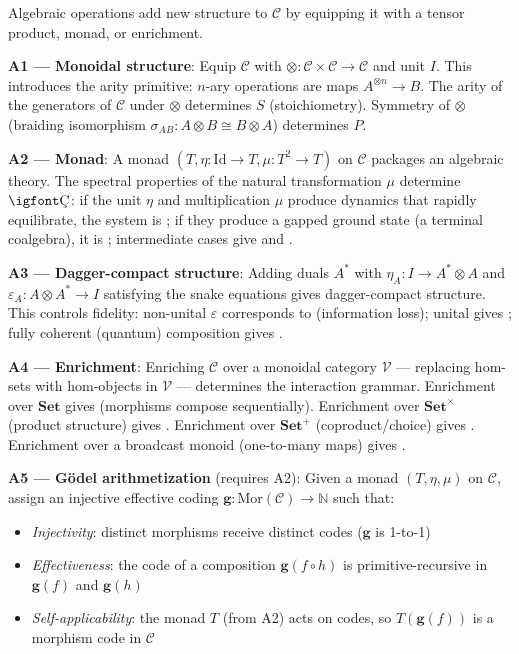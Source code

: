 \documentclass[12pt,a4paper]{article}
\newcommand{\igprimfont}{\igfont\upshape}
\begin{document}
Algebraic operations add new structure to $\mathcal{C}$ by equipping it with a tensor product, monad, or enrichment.

\textbf{A1 --- Monoidal structure}: Equip $\mathcal{C}$ with $\otimes: \mathcal{C} \times \mathcal{C} \to \mathcal{C}$ and unit $I$. This introduces the arity primitive: $n$-ary operations are maps $A^{\otimes n} \to B$. The arity of the generators of $\mathcal{C}$ under $\otimes$ determines $S$ (stoichiometry). Symmetry of $\otimes$ (braiding isomorphism $\sigma_{AB}: A \otimes B \cong B \otimes A$) determines $P$.

\textbf{A2 --- Monad}: A monad $(T, \eta: \text{Id} \to T, \mu: T^2 \to T)$ on $\mathcal{C}$ packages an algebraic theory. The spectral properties of the natural transformation $\mu$ determine $\text{{\igprimfont Ç}}$: if the unit $\eta$ and multiplication $\mu$ produce dynamics that rapidly equilibrate, the system is ; if they produce a gapped ground state (a terminal coalgebra), it is ; intermediate cases give  and .

\textbf{A3 --- Dagger-compact structure}: Adding duals $A^*$ with $\eta_A: I \to A^* \otimes A$ and $\varepsilon_A: A \otimes A^* \to I$ satisfying the snake equations gives dagger-compact structure. This controls fidelity: non-unital $\varepsilon$ corresponds to  (information loss); unital gives ; fully coherent (quantum) composition gives .

\textbf{A4 --- Enrichment}: Enriching $\mathcal{C}$ over a monoidal category $\mathcal{V}$ --- replacing hom-sets with hom-objects in $\mathcal{V}$ --- determines the interaction grammar. Enrichment over $\mathbf{Set}$ gives  (morphisms compose sequentially). Enrichment over $\mathbf{Set}^\times$ (product structure) gives . Enrichment over $\mathbf{Set}^+$ (coproduct/choice) gives . Enrichment over a broadcast monoid (one-to-many maps) gives .

\textbf{A5 --- G\"odel arithmetization} (requires A2): Given a monad $(T, \eta, \mu)$ on $\mathcal{C}$, assign an injective effective coding $\mathbf{g}: \text{Mor}(\mathcal{C}) \to \mathbb{N}$ such that:

\begin{itemize}
    \item \emph{Injectivity}: distinct morphisms receive distinct codes ($\mathbf{g}$ is 1-to-1)
    \item \emph{Effectiveness}: the code of a composition $\mathbf{g}(f \circ h)$ is primitive-recursive in $\mathbf{g}(f)$ and $\mathbf{g}(h)$
    \item \emph{Self-applicability}: the monad $T$ (from A2) acts on codes, so $T(\mathbf{g}(f))$ is a morphism code in $\mathcal{C}$
\end{itemize}
\end{document}
